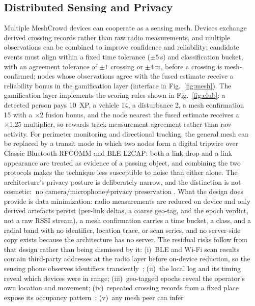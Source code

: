 \documentclass[journal,10pt]{IEEEtran}
\begin{document}
\subsection{Distributed Sensing and Privacy}
\label{sec:meshdesign}
Multiple MeshCrowd devices can cooperate as a sensing mesh. Devices
exchange derived crossing records rather than raw radio measurements, and
multiple observations can be combined to improve confidence and reliability;
candidate events must align within a fixed time tolerance ($\pm5$\,s) and classification
bucket, with an agreement tolerance of $\pm1$ crossing or $\pm4$\,m, before a crossing is mesh-confirmed; nodes whose observations
agree with the fused estimate receive a reliability bonus in the
gamification layer (interface in Fig.~\ref{fig:mesh}). The gamification layer implements the scoring rules shown in Fig.~\ref{fig:club}: a detected person pays 10~XP, a vehicle 14, a disturbance 2, a mesh confirmation 15 with a $\times2$ fusion bonus, and the node nearest the fused estimate receives a $\times1.25$ multiplier, so rewards track measurement agreement rather than raw activity. For perimeter monitoring and directional tracking, the
general mesh can be replaced by a transit mode in which two nodes form a
digital tripwire over Classic Bluetooth RFCOMM and BLE L2CAP: both a link
drop and a link appearance are treated as evidence of a passing object, and
combining the two protocols makes the technique less susceptible to noise
than either alone. The architecture's privacy posture is deliberately narrow, and the distinction
is not cosmetic: $\text{no camera/microphone} \neq \text{privacy preservation}$.
What the design does provide is data minimization: radio measurements are reduced
on device and only derived artefacts persist (per-link deltas, a coarse geo-tag,
and the epoch verdict, not a raw RSSI stream), a mesh confirmation carries a time
bucket, a class, and a radial band with no identifier, location trace, or scan
series, and no server-side copy exists because the architecture has no server.
The residual risks follow from that design rather than being dismissed by it:
(i)~BLE and Wi-Fi scan results contain third-party addresses at the radio layer
before on-device reduction, so the sensing phone observes identifiers
transiently~\cite{casar2022,ryan2013woot}; (ii)~the local log and its timing
reveal which devices were in range; (iii)~geo-tagged epochs reveal the operator's
own location and movement; (iv)~repeated crossing records from a fixed place
expose its occupancy pattern~\cite{beresford2003}; (v)~any mesh peer can infer
\end{document}

